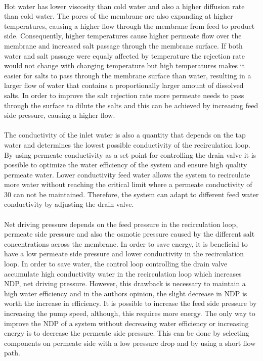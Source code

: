 \\
Hot water has lower viscosity than cold water and also a higher diffusion rate than cold water. The pores of the membrane are also expanding at higher temperatures, causing a higher flow through the membrane from feed to product side. Consequently, higher temperatures cause higher permeate flow over the membrane and increased salt passage through the membrane surface. If both water and salt passage were equaly affected by temperature the rejection rate would not change with changing temperature but high temperatures makes it easier for salts to pass through the membrane surface than water, resulting in a larger flow of water that contains a proportionally larger amount of dissolved salts. In order to improve the salt rejection rate more permeate needs to pass through the surface to dilute the salts and this can be achieved by increasing feed side pressure, causing a higher flow. \\
\\
The conductivity of the inlet water is also a quantity that depends on the tap water and determines the lowest possible conductivity of the recirculation loop. By using permeate conductivity as a set point for controlling the drain valve it is possible to optimize the water efficiency of the system and ensure high quality permeate water. Lower conductivity feed water allows the system to recirculate more water without reaching the critical limit where a permeate conductivity of 30  can not be maintained. Therefore, the system can adapt to different feed water conductivity by adjusting the drain valve.\\
\\
Net driving pressure depends on the feed pressure in the recirculation loop, permeate side pressure and also the osmotic pressure caused by the different salt concentrations across the membrane. In order to save energy, it is beneficial to have a low permeate side pressure and lower conductivity in the recirculation loop. In order to save water, the control loop controlling the drain valve accumulate high conductivity water in the recirculation loop which increases NDP, net driving pressure. However, this drawback is necessary to maintain a high water efficiency and in the authors opinion, the slight decrease in NDP is worth the increase in efficiency. It is possible to increase the feed side pressure by increasing the pump speed, although, this requires more energy. The only way to improve the NDP of a system without decreasing water efficiency or increasing energy is to decrease the permeate side pressure. This can be done by selecting components on permeate side with a low pressure drop and by using a short flow path.

